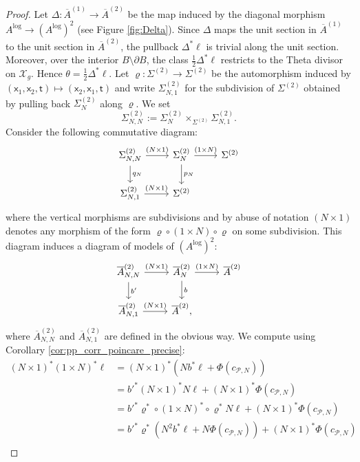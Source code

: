 \documentclass[11pt]{article}
\renewcommand{\log}{\mathrm{log}}
\newcommand{\barA}{\overline{A}}
\newcommand{\logA}{{A^{\log}}}
\theoremstyle{definition}
\begin{document}
\begin{proof}
	Let $\Delta:\barA^{(1)}\to \barA^{(2)}$ be the map induced by the diagonal morphism
	$\logA\to (\logA)^{2}$ (see Figure \ref{fig:Delta}). Since $\Delta$ maps the unit section in $\barA^{(1)}$ to the unit section
	in $\barA^{(2)}$, the pullback $\Delta^{\ast}\ell$ is trivial along the unit section. Moreover,
	over the interior $B\setminus \partial B$, the class $\frac{1}{2}\Delta^{\ast}\ell$ restricts to the Theta divisor
	on $\mathcal{X}_g$. Hence $\theta=\frac{1}{2}\Delta^{\ast}\ell$. Let $\varrho:\Sigma^{(2)}\to \Sigma^{(2)}$
	be the automorphism induced by $(\mathsf{x}_1,\mathsf{x}_2,\mathsf{t})\mapsto (\mathsf{x}_2,\mathsf{x}_1,\mathsf{t})$ and write $\Sigma_{N,1}^{(2)}$ for the subdivision
	of $\Sigma^{(2)}$ obtained by pulling back $\Sigma_N^{(2)}$ along $\varrho$. We set
	$$\Sigma_{N,N}^{(2)}:=\Sigma_N^{(2)}\times_{\Sigma^{(2)}}\Sigma_{N,1}^{(2)}.$$
	Consider the following commutative diagram:
	$$\begin{tikzcd}
		\Sigma_{N,N}^{(2)}\arrow[r,"(N\times 1)"]\arrow[d,"q_N"]&\Sigma_{N}^{(2)}\arrow[d,"p_N"]\arrow[r,"(1\times N)"]&\Sigma^{(2)}\\
		\Sigma_{N,1}^{(2)}\arrow[r,"(N\times 1)"]&\Sigma^{(2)}
	\end{tikzcd}$$
	where the vertical morphisms are subdivisions and by abuse of notation $(N\times 1)$ denotes any morphism
	of the form $\varrho\circ (1\times N)\circ \varrho$ on some subdivision. This diagram induces a diagram of models of $(\logA)^{2}$:
	$$\begin{tikzcd}
		\barA_{N,N}^{(2)}\arrow[r,"(N\times 1)"]\arrow[d,"b'"]&\barA_N^{(2)}\arrow[d,"b"]\arrow[r,"(1\times N)"]&\barA^{(2)}\\
		\barA_{N,1}^{(2)}\arrow[r,"(N\times 1)"]&\barA^{(2)},
	\end{tikzcd}$$
	where $\barA_{N,N}^{(2)}$ and $\barA_{N,1}^{(2)}$ are defined in the obvious way.
	We compute using Corollary \ref{cor:pp_corr_poincare_precise}:
	\begin{align*}
		(N\times 1)^{\ast}(1\times N)^{\ast}\ell&=(N\times 1)^{\ast}(Nb^{\ast}\ell+\Phi(c_{\mathcal P,N}))\\
												&={b'}^{\ast}(N\times 1)^{\ast}N\ell+(N\times 1)^{\ast}\Phi(c_{\mathcal P,N})\\
												&={b'}^{\ast}\varrho^{\ast}\circ (1\times N)^{\ast}\circ \varrho^{\ast}N\ell+(N\times 1)^{\ast}\Phi(c_{\mathcal P,N})\\
												&={b'}^{\ast}\varrho^{\ast}(N^{2}b^{\ast}\ell+N\Phi(c_{\mathcal P,N}))+(N\times 1)^{\ast}\Phi(c_{\mathcal P,N})\\

\end{align*}
\end{proof}
\end{document}
